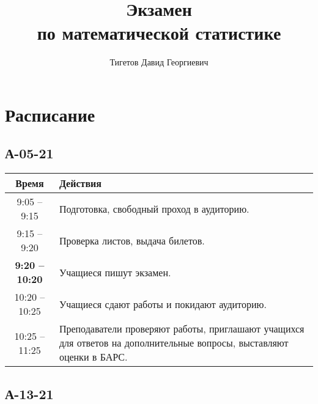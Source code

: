 \documentclass[a4paper,12pt]{article}
\begin{document}

\title{Экзамен \\ по математической статистике}
\author{Тигетов Давид Георгиевич}
\maketitle

\section{Расписание}

\subsection{А-05-21}

\begin{center}
    \begin{tabular}{|c|p{10cm}|}
        \hline
        Время                  & Действия                                                                                                             \\
        \hline
        9:05 -- 9:15           & Подготовка, свободный проход в аудиторию.                                                                            \\
        \hline
        9:15 -- 9:20           & Проверка листов, выдача билетов.                                                                                     \\
        \hline
        \textbf{9:20 -- 10:20} & Учащиеся пишут экзамен.                                                                                              \\
        \hline
        10:20 -- 10:25         & Учащиеся сдают работы и покидают аудиторию.                                                                          \\
        \hline
        10:25 -- 11:25         & Преподаватели проверяют работы, приглашают учащихся для ответов на дополнительные вопросы, выставляют оценки в БАРС. \\
        \hline
    \end{tabular}
\end{center}


\subsection{А-13-21}
\end{document}
